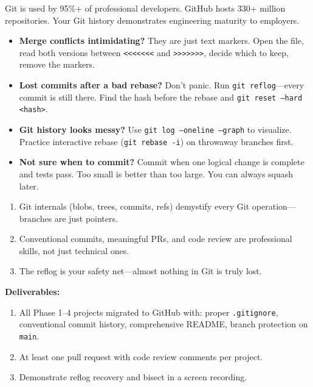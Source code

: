 \documentclass[11pt, a4paper, oneside]{report}
\begin{document}
\begin{realworldbox}
Git is used by 95\%+ of professional developers. GitHub hosts 330+ million repositories. Your Git history demonstrates engineering maturity to employers.
\end{realworldbox}


\begin{stuckbox}
\begin{itemize}[leftmargin=*]
\item \textbf{Merge conflicts intimidating?} They are just text markers. Open the file, read both versions between \texttt{<<<<<<<} and \texttt{>>>>>>>}, decide which to keep, remove the markers.
\item \textbf{Lost commits after a bad rebase?} Don't panic. Run \texttt{git reflog}---every commit is still there. Find the hash before the rebase and \texttt{git reset --hard <hash>}.
\item \textbf{Git history looks messy?} Use \texttt{git log --oneline --graph} to visualize. Practice interactive rebase (\texttt{git rebase -i}) on throwaway branches first.
\item \textbf{Not sure when to commit?} Commit when one logical change is complete and tests pass. Too small is better than too large. You can always squash later.
\end{itemize}
\end{stuckbox}


\begin{takeawaybox}
\begin{enumerate}[leftmargin=*]
\item Git internals (blobs, trees, commits, refs) demystify every Git operation---branches are just pointers.
\item Conventional commits, meaningful PRs, and code review are professional skills, not just technical ones.
\item The reflog is your safety net---almost nothing in Git is truly lost.
\end{enumerate}
\end{takeawaybox}

\begin{milestonebox}
\textbf{Deliverables:}
\begin{enumerate}[leftmargin=*]
\item All Phase 1--4 projects migrated to GitHub with: proper \texttt{.gitignore}, conventional commit history, comprehensive README, branch protection on \texttt{main}.
\item At least one pull request with code review comments per project.
\item Demonstrate reflog recovery and bisect in a screen recording.
\end{enumerate}
\end{milestonebox}
\end{document}
